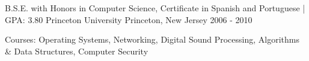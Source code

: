 

\begin{cventries}

  \cventry
    {B.S.E. with Honors in Computer Science, Certificate in Spanish and Portuguese | GPA: 3.80} %
    {Princeton University} %
    {Princeton, New Jersey} %
    {2006 - 2010} %
    {
      \begin{cvitems} %
        \item {Courses: Operating Systems, Networking, Digital Sound Processing, Algorithms \& Data Structures, Computer Security}
      \end{cvitems}
    }

\end{cventries}
